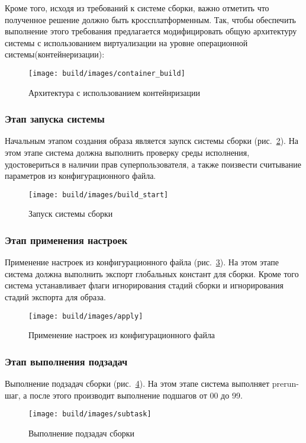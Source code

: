 Кроме того, исходя из требований к системе сборки, важно отметить что полученное решение должно быть кроссплатформенным.
Так, чтобы обеспечить выполнение этого требования предлагается модифицировать общую архитектуру системы с использованием виртуализации на уровне операционной системы(контейнеризации):

\begin{figure}[h!]
  \centering
  \setlength{\fboxsep}{5pt}
  \texttt{[image: build/images/container\_build]}
  \caption{Архитектура с использованием контейнризации}\label{fig: container_build}
\end{figure}

\newpage
\subsubsection{Этап запуска системы}

Начальным этапом создания образа является заупск системы сборки (рис.~\ref{fig: build_start}).
  На этом этапе система должна выполнить проверку среды исполнения, удостовериться в наличии прав суперпользователя, а также поизвести считывание параметров из конфигурационного файла.
  \begin{figure}[h!]
    \centering
    \setlength{\fboxsep}{5pt}
    \texttt{[image: build/images/build\_start]}
    \caption{Запуск системы сборки}\label{fig: build_start}
  \end{figure}

\newpage
\subsubsection{Этап применения настроек}
Применение настроек из конфигурационного файла (рис.~\ref{fig: apply}). На этом этапе система должна выполнить экспорт глобальных констант для сборки.
Кроме того система устанавливает флаги игнорирования стадий сборки и игнорирования стадий экспорта для образа.
\begin{figure}[h!]
  \centering
  \setlength{\fboxsep}{5pt}
  \texttt{[image: build/images/apply]}
  \caption{Применение настроек из конфигурационного файла}\label{fig: apply}
\end{figure}

\newpage
\subsubsection{Этап выполнения подзадач}
Выполнение подзадач сборки (рис.~\ref{fig: subtask}). На этом этапе система выполняет prerun-шаг, а после этого производит выполнение подшагов от 00 до 99.
\begin{figure}[h!]
  \centering
  \setlength{\fboxsep}{5pt}
  \texttt{[image: build/images/subtask]}
  \caption{Выполнение подзадач сборки}\label{fig: subtask}
\end{figure}

